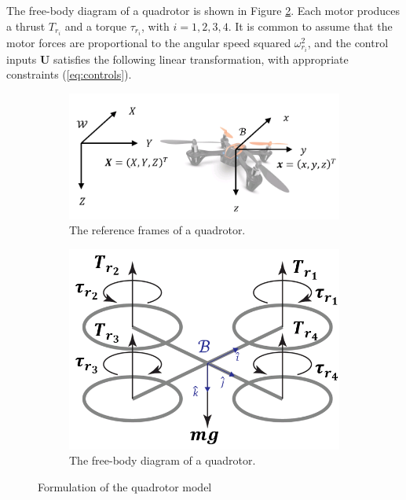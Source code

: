 \documentclass[journal,11pt,onecolumn,draftclsnofoot,]{IEEEtran}
\begin{document}
The free-body diagram of a quadrotor is shown in Figure \ref{fig:FBD}. Each motor produces a thrust $T_{r_i}$ and a torque $\tau _{r_i}$, with $i=1,2,3,4$. It is common to assume that the motor forces are proportional to the angular speed squared $\omega _{r_i}^2$, and the control inputs $\boldsymbol{U}$ satisfies the following linear transformation, with appropriate constraints (\ref{eq:controls}).

\begin{figure}
    \centering
    \begin{subfigure}[b]{.45\columnwidth}
        \centering
        \includegraphics[width=\columnwidth]{frames_quadrotor}
        \caption{The reference frames of a quadrotor.}
        \label{fig:frames}
    \end{subfigure}%
	\hfill
    \begin{subfigure}[b]{.45\columnwidth}
        \centering
        \includegraphics[width=\columnwidth]{FBD_quadrotor}
        \caption{The free-body diagram of a quadrotor.}
        \label{fig:FBD}
    \end{subfigure}
    \caption{Formulation of the quadrotor model}
    \label{fig:formulation_quadrotor}
\end{figure}
\end{document}
